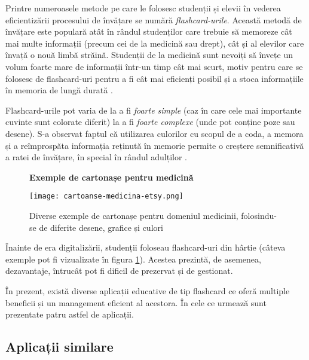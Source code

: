 Printre numeroasele metode pe care le folosesc studenții și elevii în vederea eficientizării procesului de învățare se numără \textit{flashcard-urile}. Această metodă de învățare este populară atât în rândul studenților care trebuie să memoreze cât mai multe informații (precum cei de la medicină sau drept), cât și al elevilor care învață o nouă limbă străină. Studenții de la medicină sunt nevoiți să învețe un volum foarte mare de informații într-un timp cât mai scurt, motiv pentru care se folosesc de flashcard-uri pentru a fi cât mai eficienți posibil și a stoca informațiile în memoria de lungă durată \cite{in2med}.

Flashcard-urile pot varia de la a fi \textit{foarte simple} (caz în care cele mai importante cuvinte sunt colorate diferit) la a fi \textit{foarte complexe} (unde pot conține poze sau desene). S-a observat faptul că utilizarea culorilor cu scopul de a coda, a memora și a reîmprospăta informația reținută în memorie permite o creștere semnificativă a ratei de învățare, în special în rândul adulților \cite{journalEducation}.

\noindent\begin{minipage}{0.6\textwidth}
    \begin{figure}[H]
    \centering
    \textbf{Exemple de cartonașe pentru medicină}\par\medskip
    \texttt{[image: cartoanse-medicina-etsy.png]}
    \caption{Diverse exemple de cartonașe pentru domeniul medicinii, folosindu-se de diferite desene, grafice și culori \cite{etsyPaperFlashCardsMedicine}} 
    \label{fig:cartonase}
    \end{figure}
\end{minipage}
\hfill
\begin{minipage}{0.35\textwidth}
    Înainte de era digitalizării, studenții foloseau flashcard-uri din hârtie (câteva exemple pot fi vizualizate în figura \ref{fig:cartonase}). Acestea prezintă, de asemenea, dezavantaje, întrucât pot fi dificil de prezervat și de gestionat.

    În prezent, există diverse aplicații educative de tip flashcard ce oferă multiple beneficii și un management eficient al acestora. În cele ce urmează sunt prezentate patru astfel de aplicații.
\end{minipage}

\subsection{Aplicații similare}

